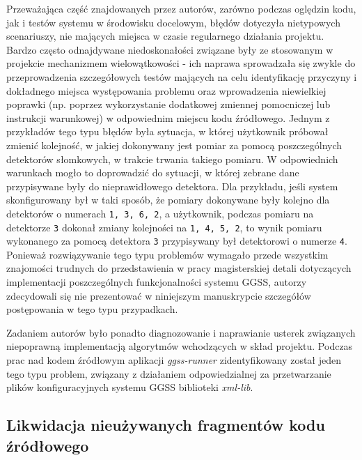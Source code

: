 Przeważająca część znajdowanych przez autorów, zarówno podczas oględzin kodu, jak i testów systemu w środowisku docelowym, błędów dotyczyła nietypowych scenariuszy, nie mających miejsca w czasie regularnego działania projektu. Bardzo często odnajdywane niedoskonałości związane były ze stosowanym w projekcie mechanizmem wielowątkowości - ich naprawa sprowadzała się zwykle do przeprowadzenia szczegółowych testów mających na celu identyfikację przyczyny i dokładnego miejsca występowania problemu oraz wprowadzenia niewielkiej poprawki (np. poprzez wykorzystanie dodatkowej zmiennej pomocniczej lub instrukcji warunkowej) w odpowiednim miejscu kodu źródłowego. Jednym z przykładów tego typu błędów była sytuacja, w której użytkownik próbował zmienić kolejność, w jakiej dokonywany jest pomiar za pomocą poszczególnych detektorów słomkowych, w trakcie trwania takiego pomiaru. W odpowiednich warunkach mogło to doprowadzić do sytuacji, w której zebrane dane przypisywane były do nieprawidłowego detektora. Dla przykładu, jeśli system skonfigurowany był w taki sposób, że pomiary dokonywane były kolejno dla detektorów o numerach \lstinline{1, 3, 6, 2}, a użytkownik, podczas pomiaru na detektorze \lstinline{3} dokonał zmiany kolejności na \lstinline{1, 4, 5, 2}, to wynik pomiaru wykonanego za pomocą detektora \lstinline{3} przypisywany był detektorowi o numerze \lstinline{4}. Ponieważ rozwiązywanie tego typu problemów wymagało przede wszystkim znajomości trudnych do przedstawienia w pracy magisterskiej detali dotyczących implementacji poszczególnych funkcjonalności systemu GGSS, autorzy zdecydowali się nie prezentować w niniejszym manuskrypcie szczegółów postępowania w tego typu przypadkach.

Zadaniem autorów było ponadto diagnozowanie i naprawianie usterek związanych niepoprawną implementacją algorytmów wchodzących w skład projektu. Podczas prac nad kodem źródłowym aplikacji \emph{ggss-runner} zidentyfikowany został jeden tego typu problem, związany z działaniem odpowiedzialnej za przetwarzanie plików konfiguracyjnych systemu GGSS biblioteki \emph{xml-lib}.



\subsection{Likwidacja nieużywanych fragmentów kodu źródłowego}

